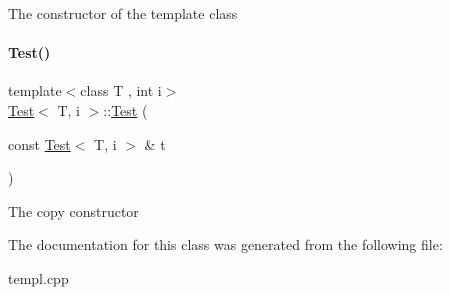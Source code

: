 The constructor of the template class \mbox{\label{class_test_adcf1bc755df94c4d07519c0a02aa1cc0}} 
\paragraph{\texorpdfstring{Test()}{Test()}\hspace{0.1cm}{\footnotesize\ttfamily [2/2]}}
{\footnotesize\ttfamily template$<$class T , int i$>$ \\
\mbox{\hyperlink{class_test}{Test}}$<$ T, i $>$\+::\mbox{\hyperlink{class_test}{Test}} (\begin{DoxyParamCaption}\item[{const \mbox{\hyperlink{class_test}{Test}}$<$ T, i $>$ \&}]{t }\end{DoxyParamCaption})}

The copy constructor 

The documentation for this class was generated from the following file\+:\begin{DoxyCompactItemize}
\item 
templ.\+cpp\end{DoxyCompactItemize}
